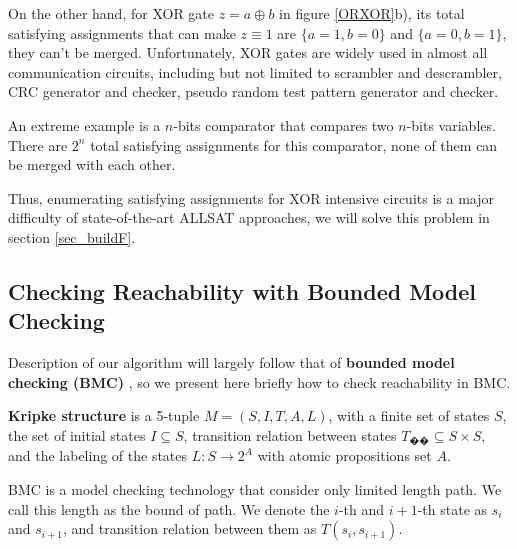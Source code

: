 \documentclass[journal]{IEEEtran}
\begin{document}
On the other hand,
for XOR gate $z= a \oplus b$ in figure \ref{ORXOR}b),
its total satisfying assignments that can make $z\equiv 1$ are $\{a= 1, b= 0\}$ and $\{a= 0, b= 1\}$,
they can't be merged.
Unfortunately, XOR gates are widely used in almost all communication circuits,
including but not limited to scrambler and descrambler,
CRC generator and checker,
pseudo random test pattern generator and checker.

An extreme example is a $n$-bits comparator that compares two $n$-bits variables.
There are $2^n$ total satisfying assignments for this comparator,
none of them can be merged with each other.

Thus, enumerating satisfying assignments for XOR intensive circuits is a major difficulty of state-of-the-art ALLSAT approaches,
we will solve this problem in section \ref{sec_buildF}.



\subsection{Checking Reachability with Bounded Model Checking}

Description of our algorithm will largely follow that of \textbf{bounded model checking (BMC)} \cite{SMCSAT},
so we present here briefly how to check reachability in BMC.

\vspace{0.2cm}

\begin{definition11}\label{KripkeStructure}
\textbf{Kripke structure} is a 5-tuple $M=(S,I,T,A,L)$, with a finite set of states $S$,
the set of initial states $I\subseteq S$,
transition relation between states $T_{��}\subseteq S\times S$,
and the labeling of the states $L:S\rightarrow 2^{A}$ with atomic propositions set $A$.
\end{definition11}

\vspace{0.2cm}

BMC is a model checking technology that consider only limited length path.
We call this length as the bound of path.
We denote the $i$-th and $i+1$-th state as $s_i$ and $s_{i+1}$,
and transition relation between them as $T(s_i,s_{i+1})$.
\end{document}
